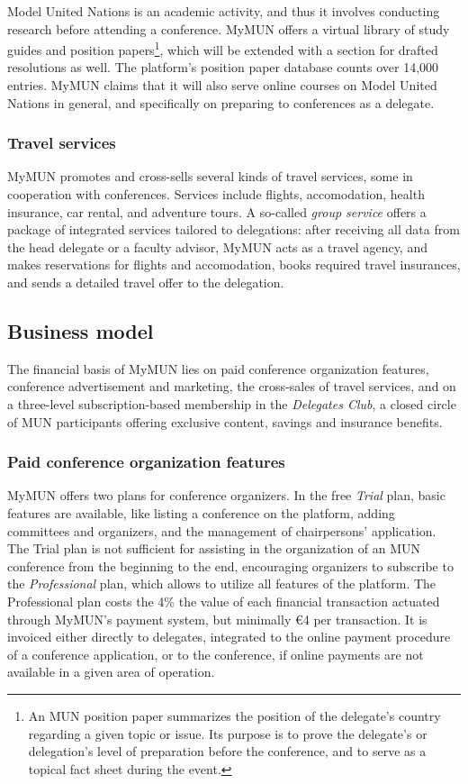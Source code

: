 Model United Nations is an academic activity, and thus it involves conducting research before attending a conference. MyMUN offers a virtual library of study guides and position papers\footnote{An MUN position paper summarizes the position of the delegate's country regarding a given topic or issue. Its purpose is to prove the delegate's or delegation's level of preparation before the conference, and to serve as a topical fact sheet during the event.}, which will be extended with a section for drafted resolutions as well. The platform's position paper database counts over 14,000 entries. MyMUN claims that it will also serve online courses on Model United Nations in general, and specifically on preparing to conferences as a delegate.

\subsubsection{Travel services}

MyMUN promotes and cross-sells several kinds of travel services, some in cooperation with conferences. Services include flights, accomodation, health insurance, car rental, and adventure tours. A so-called \emph{group service} offers a package of integrated services tailored to delegations: after receiving all data from the head delegate or a faculty advisor, MyMUN acts as a travel agency, and makes reservations for flights and accomodation, books required travel insurances, and sends a detailed travel offer to the delegation.

\subsection{Business model}

The financial basis of MyMUN lies on paid conference organization features, conference advertisement and marketing, the cross-sales of travel services, and on a three-level subscription-based membership in the \emph{Delegates Club}, a closed circle of MUN participants offering exclusive content, savings and insurance benefits.

\subsubsection{Paid conference organization features}

MyMUN offers two plans for conference organizers. In the free \emph{Trial} plan, basic features are available, like listing a conference on the platform, adding committees and organizers, and the management of chairpersons' application. The Trial plan is not sufficient for assisting in the organization of an MUN conference from the beginning to the end, encouraging organizers to subscribe to the \emph{Professional} plan, which allows to utilize all features of the platform. The Professional plan costs the 4\% the value of each financial transaction actuated through MyMUN's payment system, but minimally €4 per transaction. It is invoiced either directly to delegates, integrated to the online payment procedure of a conference application, or to the conference, if online payments are not available in a given area of operation.

